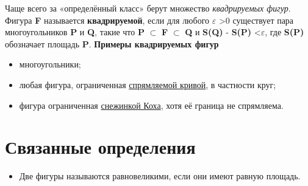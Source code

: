 \documentclass[a4paper,8pt,leqno]{article}
\theoremstyle{plain}
\theoremstyle{definition} %
\theoremstyle{remark} %
\begin{document}
Чаще всего за «определённый класс» берут множество \textit{квадрируемых фигур}. Фигура \textbf{F} называется \textbf{квадрируемой}, если для любого $\varepsilon$ >0 существует пара многоугольников \textbf{P} и \textbf{Q}, такие что \textbf{P} $\subset$ \textbf{F} $\subset$ \textbf{Q} и \textbf{S(Q)} - \textbf{S(P)} <$\varepsilon$, где \textbf{S(P)} обозначает площадь \textbf{P}.
\textbf{Примеры квадрируемых фигур}
\begin{itemize}
\item многоугольники;
\item любая фигура, ограниченная \href{https://ru.wikipedia.org/wiki/\%D0\%A1\%D0\%BF\%D1\%80\%D1\%8F\%D0\%BC\%D0\%BB\%D1\%8F\%D0\%B5\%D0\%BC\%D0\%B0\%D1\%8F\_\%D0\%BA\%D1\%80\%D0\%B8\%D0\%B2\%D0\%B0\%D1\%8F}{спрямляемой кривой}, в частности круг;
\item фигура ограниченная \href{https://ru.wikipedia.org/wiki/\%D0\%A1\%D0\%BD\%D0\%B5\%D0\%B6\%D0\%B8\%D0\%BD\%D0\%BA\%D0\%B0\_\%D0\%9A\%D0\%BE\%D1\%85\%D0\%B0}{снежинкой Коха}, хотя её граница не спрямляема.
\end{itemize}
\section{Связанные определения}
\begin{itemize}
\item Две фигуры называются равновеликими, если они имеют равную площадь.
\end{itemize}
\end{document}
